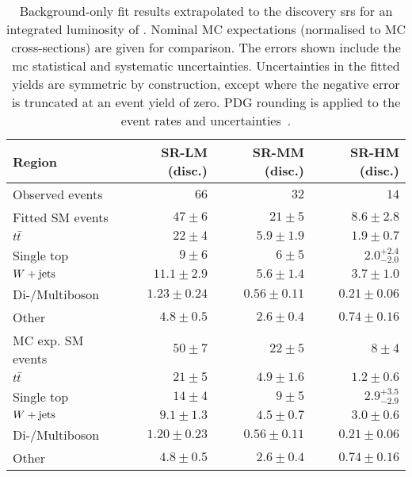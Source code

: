 

\begin{table}
\begin{center}
{\small
\begin{tabular}{lrrr}
\toprule
Region           & SR-LM (disc.)           & SR-MM (disc.)           & SR-HM  (disc.)            \\
\midrule
Observed events          & $66$              & $32$              & $14$                    \\
\midrule
Fitted SM events         & $47 \pm 6$          & $21 \pm 5$          & $8.6 \pm 2.8$              \\
\midrule
        $t\bar{t}$         & $22 \pm 4$          & $5.9 \pm 1.9$          & $1.9 \pm 0.7$              \\
        Single top         & $9 \pm 6$          & $6 \pm 5$          & $2.0_{-2.0}^{+2.4}$              \\
        $W+\mathrm{jets}$         & $11.1 \pm 2.9$          & $5.6 \pm 1.4$          & $3.7 \pm 1.0$              \\
        Di-/Multiboson         & $1.23 \pm 0.24$          & $0.56 \pm 0.11$          & $0.21 \pm 0.06$              \\
        Other         & $4.8 \pm 0.5$          & $2.6 \pm 0.4$          & $0.74 \pm 0.16$              \\
\toprule
MC exp. SM events              & $50 \pm 7$          & $22 \pm 5$          & $8 \pm 4$              \\
\midrule
        $t\bar{t}$         & $21 \pm 5$          & $4.9 \pm 1.6$          & $1.2 \pm 0.6$              \\
        Single top         & $14 \pm 4$          & $9 \pm 5$          & $2.9_{-2.9}^{+3.5}$              \\
        $W+\mathrm{jets}$         & $9.1 \pm 1.3$          & $4.5 \pm 0.7$          & $3.0 \pm 0.6$              \\
        Di-/Multiboson         & $1.20 \pm 0.23$          & $0.56 \pm 0.11$          & $0.21 \pm 0.06$              \\
        Other        & $4.8 \pm 0.5$          & $2.6 \pm 0.4$          & $0.74 \pm 0.16$              \\
\bottomrule
\end{tabular}
}
\end{center}
\caption{ Background-only fit results extrapolated to the discovery \glspl{sr} for an integrated luminosity of \onethirtynineifb. Nominal MC expectations (normalised to MC cross-sections) are given for comparison. The errors shown include the \gls{mc} statistical and systematic uncertainties. Uncertainties in the fitted yields are symmetric by construction, except where the negative error is truncated at an event yield of zero. PDG rounding is applied to the event rates and uncertainties~\cite{pdg2020}.}
\label{tab:results_bkg_only_SR_disc}
\end{table}
%